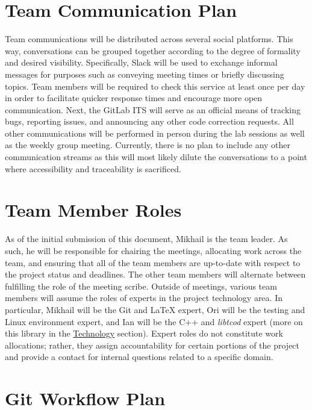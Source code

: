 \documentclass{article}
\begin{document}
\section{Team Communication Plan}

\indent
Team communications will be distributed across several social platforms.  This way, conversations can be grouped together according to the degree of formality and desired visibility.  Specifically, Slack will be used to exchange informal messages for purposes such as conveying meeting times or briefly discussing topics.  Team members will be required to check this service at least once per day in order to facilitate quicker response times and encourage more open communication.  Next, the GitLab ITS will serve as an official means of tracking bugs, reporting issues, and announcing any other code correction requests.  All other communications will be performed in person during the lab sessions as well as the weekly group meeting.  Currently, there is no plan to include any other communication streams as this will most likely dilute the conversations to a point where accessibility and traceability is sacrificed.

\section{Team Member Roles}

\indent
As of the initial submission of this document, Mikhail is the team leader.  As such, he will be responsible for chairing the meetings, allocating work across the team, and ensuring that all of the team members are up-to-date with respect to the project status and deadlines.  The other team members will alternate between fulfilling the role of the meeting scribe. Outside of meetings, various team members will assume the roles of experts in the project technology area.  In particular, Mikhail will be the Git and LaTeX expert, Ori will be the testing and Linux environment expert, and Ian will be the C++ and \textit{libtcod} expert (more on this library in the \hyperref[tech_label]{Technology} section).  Expert roles do not constitute work allocations; rather, they assign accountability for certain portions of the project and provide a contact for internal questions related to a specific domain.

\section{Git Workflow Plan}
\end{document}
